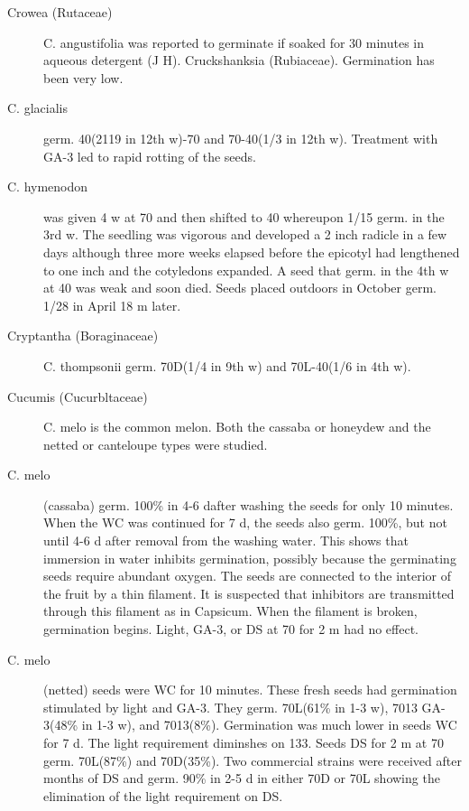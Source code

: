 \begin{description}
\item[Crowea (Rutaceae)] C. angustifolia was reported to germinate if soaked for
30 minutes in aqueous detergent (J H).
Cruckshanksia (Rubiaceae). Germination has been very low.
\item[C. glacialis] germ. 40(2119 in 12th w)-70 and 70-40(1/3 in 12th w). Treatment
with GA-3 led to rapid rotting of the seeds.
\item[C. hymenodon] was given 4 w at 70 and then shifted to 40 whereupon 1/15
germ. in the 3rd w. The seedling was vigorous and developed a 2 inch radicle in a
few days although three more weeks elapsed before the epicotyl had lengthened to
one inch and the cotyledons expanded. A seed that germ. in the 4th w at 40 was weak
and soon died. Seeds placed outdoors in October germ. 1/28 in April 18 m later.

\item[Cryptantha (Boraginaceae)] C. thompsonii germ. 70D(1/4 in 9th w) and
70L-40(1/6 in 4th w).
\item[Cucumis (Cucurbltaceae)] C. melo is the common melon. Both the
cassaba or honeydew and the netted or canteloupe types were studied.
\item[C. melo] (cassaba) germ. 100\% in 4-6 dafter washing the seeds for only 10
minutes. When the WC was continued for 7 d, the seeds also germ. 100\%, but not
until 4-6 d after removal from the washing water. This shows that immersion in water
inhibits germination, possibly because the germinating seeds require abundant
oxygen. The seeds are connected to the interior of the fruit by a thin filament. It is
suspected that inhibitors are transmitted through this filament as in Capsicum. When
the filament is broken, germination begins. Light, GA-3, or DS at 70 for 2 m had no
effect.
\item[C. melo] (netted) seeds were WC for 10 minutes. These fresh seeds had
germination stimulated by light and GA-3. They germ. 70L(61\% in 1-3 w), 7013 GA-
3(48\% in 1-3 w), and 7013(8\%). Germination was much lower in seeds WC for 7 d.
The light requirement diminshes on 133. Seeds DS for 2 m at 70 germ. 70L(87\%) and
70D(35\%). Two commercial strains were received after months of DS and germ. 90\%
in 2-5 d in either 70D or 70L showing the elimination of the light requirement on DS.


\end{description}
